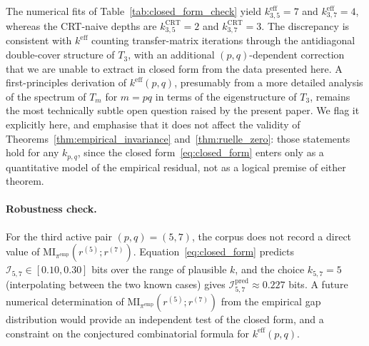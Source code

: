 \begin{remark}
\label{rmk:k_interp}
The numerical fits of Table~\ref{tab:closed_form_check} yield
$k_{3,5}^{\mathrm{eff}} = 7$ and $k_{3,7}^{\mathrm{eff}} = 4$,
whereas the CRT-naive depths are $k_{3,5}^{\mathrm{CRT}} = 2$ and
$k_{3,7}^{\mathrm{CRT}} = 3$. The discrepancy is consistent with
$k^{\mathrm{eff}}$ counting transfer-matrix iterations through the
antidiagonal double-cover structure of $T_3$, with an additional
$(p, q)$-dependent correction that we are unable to extract in
closed form from the data presented here. A first-principles
derivation of $k^{\mathrm{eff}}(p, q)$, presumably from a more
detailed analysis of the spectrum of $T_m$ for
$m = pq$ in terms of the eigenstructure of $T_3$, remains the most
technically subtle open question raised by the present paper. We
flag it explicitly here, and emphasise that it does not affect the
validity of Theorems~\ref{thm:empirical_invariance}
and~\ref{thm:ruelle_zero}: those statements hold for any
$k_{p,q}$, since the closed form~\eqref{eq:closed_form} enters only
as a quantitative model of the empirical residual, not as a logical
premise of either theorem.
\end{remark}

\paragraph{Robustness check.}
For the third active pair $(p, q) = (5, 7)$, the corpus does not
record a direct value of $\mathrm{MI}_{\pi^{\mathrm{emp}}}(r^{(5)};
r^{(7)})$. Equation~\eqref{eq:closed_form} predicts
$\mathcal{I}_{5,7} \in [0.10, 0.30]$ bits over the range of
plausible $k$, and the choice $k_{5,7} = 5$ (interpolating between
the two known cases) gives $\mathcal{I}_{5,7}^{\mathrm{pred}}
\approx 0.227$ bits. A future numerical determination of
$\mathrm{MI}_{\pi^{\mathrm{emp}}}(r^{(5)}; r^{(7)})$ from the
empirical gap distribution would provide an independent test of the
closed form, and a constraint on the conjectured combinatorial
formula for $k^{\mathrm{eff}}(p, q)$.
